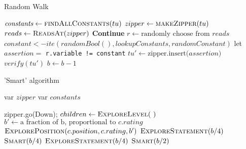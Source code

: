 \documentclass{article}
\begin{document}
\begin{algorithm}
\begin{algorithmic}
  \caption{Random Walk}
  \State $\textit{constants} \gets \Call{findAllConstants}{tu}$
  \State $zipper \gets \Call{makeZipper}{tu}$
  \State {}
  \State $reads \gets \Call{ReadsAt}{zipper}$
  \State \textbf{Continue}
  \EndIf
  \State $r \gets \text{randomly choose from $reads$}$
  \State $constant <- ite(randomBool(), lookupConstants, randomConstant)$
  \State let $assertion = $ \texttt{r.variable != constant}
  \State $tu' \gets \text{zipper.insert($assertion$)}$
  \State $verify(tu')$
  \State $b \gets b - 1$
  \EndWhile
  \EndProcedure
\end{algorithmic}
\end{algorithm}



\begin{algorithm}[ht]
  \caption{'Smart' algorithm}
  \begin{algorithmic}
  \State var $zipper$
  \State var $\textit{constants}$

    \State zipper.go(Down);
  \EndWhile
  \State $ children \gets \Call{ExploreLevel}{\ }$
      \State $b' \gets \text{a fraction of b, proportional to $c.rating$} $
      \State $\Call{ExplorePosition}{c.position, c.rating, b'}$
  \EndFor
  \EndProcedure
  \vspace{1em}
    \State $\Call{ExploreStatement}{b / 4}$
    \State $\Call{Smart}{b / 4}$ 
  \Else
    \State $\Call{ExploreStatement}{b / 4}$
  \EndIf
    \State $\Call{Smart}{b / 2}$ 
  \EndIf
  \EndProcedure
  \vspace{1em}
   \EndIf
  
  \EndFor
  \EndProcedure
\end{algorithmic}
\end{algorithm}
\end{document}
